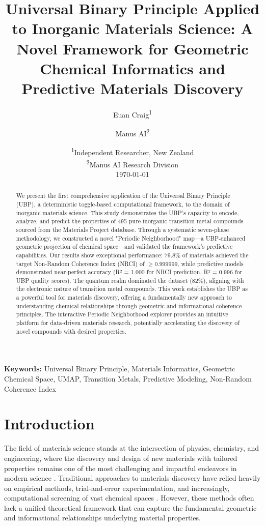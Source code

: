 \documentclass[12pt,a4paper]{article}
\title{\textbf{Universal Binary Principle Applied to Inorganic Materials Science: A Novel Framework for Geometric Chemical Informatics and Predictive Materials Discovery}}
\author{
Euan Craig\textsuperscript{1} \and 
Manus AI\textsuperscript{2}
}
\date{
\textsuperscript{1}Independent Researcher, New Zealand \\
\textsuperscript{2}Manus AI Research Division \\
\vspace{0.5cm}
\today
}
\begin{document}
\maketitle

\begin{abstract}
We present the first comprehensive application of the Universal Binary Principle (UBP), a deterministic toggle-based computational framework, to the domain of inorganic materials science. This study demonstrates the UBP's capacity to encode, analyze, and predict the properties of 495 pure inorganic transition metal compounds sourced from the Materials Project database. Through a systematic seven-phase methodology, we constructed a novel "Periodic Neighborhood" map—a UBP-enhanced geometric projection of chemical space—and validated the framework's predictive capabilities. Our results show exceptional performance: 79.8\% of materials achieved the target Non-Random Coherence Index (NRCI) of $\geq 0.999999$, while predictive models demonstrated near-perfect accuracy (R² = 1.000 for NRCI prediction, R² = 0.996 for UBP quality scores). The quantum realm dominated the dataset (82\%), aligning with the electronic nature of transition metal compounds. This work establishes the UBP as a powerful tool for materials discovery, offering a fundamentally new approach to understanding chemical relationships through geometric and informational coherence principles. The interactive Periodic Neighborhood explorer provides an intuitive platform for data-driven materials research, potentially accelerating the discovery of novel compounds with desired properties.
\end{abstract}

\textbf{Keywords:} Universal Binary Principle, Materials Informatics, Geometric Chemical Space, UMAP, Transition Metals, Predictive Modeling, Non-Random Coherence Index

\section{Introduction}

The field of materials science stands at the intersection of physics, chemistry, and engineering, where the discovery and design of new materials with tailored properties remains one of the most challenging and impactful endeavors in modern science \cite{butler2018machine}. Traditional approaches to materials discovery have relied heavily on empirical methods, trial-and-error experimentation, and increasingly, computational screening of vast chemical spaces \cite{curtarolo2013high}. However, these methods often lack a unified theoretical framework that can capture the fundamental geometric and informational relationships underlying material properties.
\end{document}
